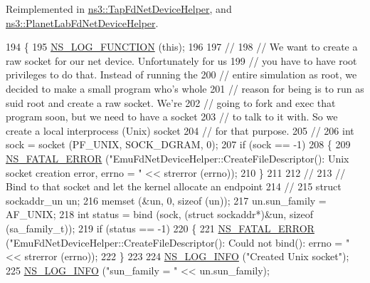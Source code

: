 Reimplemented in \hyperlink{classns3_1_1TapFdNetDeviceHelper_a096fe572156c6f315ca33f30d93e41c1}{ns3\+::\+Tap\+Fd\+Net\+Device\+Helper}, and \hyperlink{classns3_1_1PlanetLabFdNetDeviceHelper_ab758ef1ac544c73625dbfd6fa9d48e4f}{ns3\+::\+Planet\+Lab\+Fd\+Net\+Device\+Helper}.


\begin{DoxyCode}
194 \{
195   \hyperlink{log-macros-disabled_8h_a90b90d5bad1f39cb1b64923ea94c0761}{NS\_LOG\_FUNCTION} (\textcolor{keyword}{this});
196 
197   \textcolor{comment}{//}
198   \textcolor{comment}{// We want to create a raw socket for our net device.  Unfortunately for us}
199   \textcolor{comment}{// you have to have root privileges to do that.  Instead of running the}
200   \textcolor{comment}{// entire simulation as root, we decided to make a small program who's whole}
201   \textcolor{comment}{// reason for being is to run as suid root and create a raw socket.  We're}
202   \textcolor{comment}{// going to fork and exec that program soon, but we need to have a socket}
203   \textcolor{comment}{// to talk to it with.  So we create a local interprocess (Unix) socket}
204   \textcolor{comment}{// for that purpose.}
205   \textcolor{comment}{//}
206   \textcolor{keywordtype}{int} sock = socket (PF\_UNIX, SOCK\_DGRAM, 0);
207   \textcolor{keywordflow}{if} (sock == -1)
208     \{
209       \hyperlink{group__fatal_ga5131d5e3f75d7d4cbfd706ac456fdc85}{NS\_FATAL\_ERROR} (\textcolor{stringliteral}{"EmuFdNetDeviceHelper::CreateFileDescriptor(): Unix socket creation
       error, errno = "} << strerror (errno));
210     \}
211 
212   \textcolor{comment}{//}
213   \textcolor{comment}{// Bind to that socket and let the kernel allocate an endpoint}
214   \textcolor{comment}{//}
215   \textcolor{keyword}{struct }sockaddr\_un un;
216   memset (&un, 0, \textcolor{keyword}{sizeof} (un));
217   un.sun\_family = AF\_UNIX;
218   \textcolor{keywordtype}{int} status = bind (sock, (\textcolor{keyword}{struct} sockaddr*)&un, \textcolor{keyword}{sizeof} (sa\_family\_t));
219   \textcolor{keywordflow}{if} (status == -1)
220     \{
221       \hyperlink{group__fatal_ga5131d5e3f75d7d4cbfd706ac456fdc85}{NS\_FATAL\_ERROR} (\textcolor{stringliteral}{"EmuFdNetDeviceHelper::CreateFileDescriptor(): Could not bind(): errno
       = "} << strerror (errno));
222     \}
223 
224   \hyperlink{group__logging_gafbd73ee2cf9f26b319f49086d8e860fb}{NS\_LOG\_INFO} (\textcolor{stringliteral}{"Created Unix socket"});
225   \hyperlink{group__logging_gafbd73ee2cf9f26b319f49086d8e860fb}{NS\_LOG\_INFO} (\textcolor{stringliteral}{"sun\_family = "} << un.sun\_family);

\end{DoxyCode}
